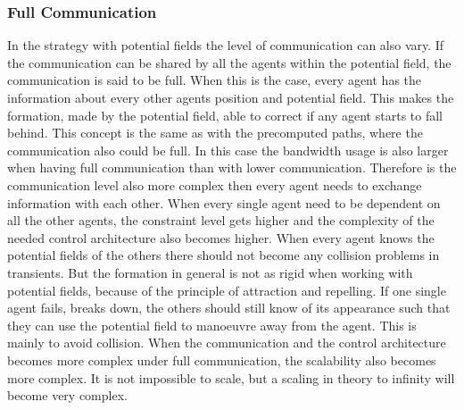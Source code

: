 \subsubsection{Full Communication}
In the strategy with potential fields the level of communication can also vary. If the communication can be shared by all the agents within the potential field, the communication is said to be full. When this is the case, every agent has the information about every other agents position and potential field. This makes the formation, made by the potential field, able to correct if any agent starts to fall behind. This concept is the same as with the precomputed paths, where the communication also could be full. In this case the bandwidth usage is also larger when having full communication than with lower communication. Therefore is the communication level also more complex then every agent needs to exchange information with each other. When every single agent need to be dependent on all the other agents, the constraint level gets higher and the complexity of the needed control architecture also becomes higher. When every agent knows the potential fields of the others there should not become any collision problems in transients. But the formation in general is not as rigid when working with potential fields, because of the principle of attraction and repelling. If one single agent fails, breaks down, the others should still know of its appearance such that they can use the potential field to manoeuvre away from the agent. This is mainly to avoid collision. When the communication and the control architecture becomes more complex under full communication, the scalability also becomes more complex. It is not impossible to scale, but a scaling in theory to infinity will become very complex.

